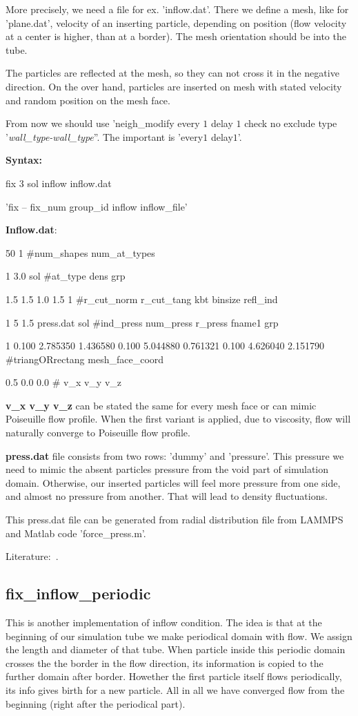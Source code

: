 More precisely, we need a file for ex. 'inflow.dat'. There we define a mesh, like for 'plane.dat', velocity of an inserting particle, depending on position (flow velocity at a center is higher, than at a border). The mesh orientation should be into the tube.

The particles are reflected at the mesh, so they can not cross it in the negative direction. On the over hand, particles are inserted on mesh with stated velocity and random position on the mesh face.

From now we should use 'neigh\_modify    every $1$ delay $1$ check no exclude type '\textit{wall\_type-wall\_type}''. The important is 'every$1$ delay$1$'.

\textbf{Syntax:}

fix     $3$ sol inflow inflow.dat

'fix -- fix\_num group\_id inflow inflow\_file'

\textbf{Inflow.dat}:

50 1 \#num\_shapes num\_at\_types

1 3.0 sol \#at\_type dens grp

1.5 1.5 1.0 1.5 1 \#r\_cut\_norm r\_cut\_tang kbt binsize refl\_ind

1 5 1.5 press.dat sol \#ind\_press num\_press r\_press fname1 grp

1 0.100 2.785350 1.436580 0.100 5.044880 0.761321 0.100 4.626040 2.151790 \#triangORrectang mesh\_face\_coord

0.5 0.0 0.0 \# v\_x v\_y v\_z

\textbf{v\_x v\_y v\_z} can be stated the same for every mesh face or can mimic Poiseuille flow profile. When the first variant is applied, due to viscosity, flow will naturally converge to Poiseuille flow profile.

\textbf{press.dat} file consists from two rows: 'dummy' and 'pressure'. This pressure we need to mimic the absent particles pressure from the void part of simulation domain. Otherwise, our inserted particles will feel more pressure from one side, and almost no pressure from another. That will lead to density fluctuations.

This press.dat file can be generated from radial distribution file from LAMMPS and Matlab code 'force\_press.m'.

Literature:~\cite{Lei20113765}.

\subsection{fix\_inflow\_periodic}
This is another implementation of inflow condition. The idea is that at the beginning of our simulation tube we make periodical domain with flow. We assign the length and diameter of that tube. When particle inside this periodic domain crosses the the border in the flow direction, its information is copied to the further domain after border. Howether the first particle itself flows periodically, its info gives birth for a new particle. All in all we have converged flow from the beginning (right after the periodical part).


